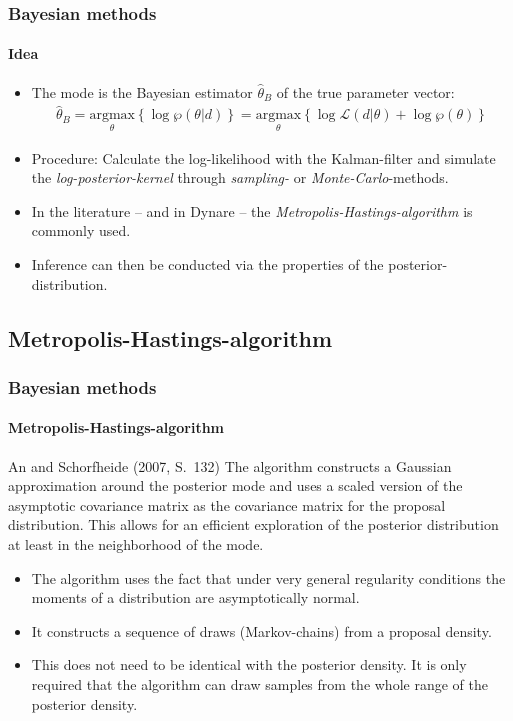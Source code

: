 \documentclass[handout]{beamer}  %
\begin{document}
\begin{frame}\frametitle{Bayesian methods}\framesubtitle{Idea}
	\begin{itemize}
		\item The mode is the Bayesian estimator ${\widehat{\theta}_B}$ of the true parameter vector:
		\begin{align*}
			{\widehat{\theta}_B} = \underset{\theta}{\text{argmax}}\left\{\log{\wp({\theta}|{d})}\right\} = \underset{\theta}{\text{argmax}}\left\{ \log{\mathcal{L}({d}|{\theta})} + \log{\wp({\theta})} \right\}
		\end{align*}
		\item Procedure: Calculate the log-likelihood with the Kalman-filter and simulate the \emph{log-posterior-kernel} through \emph{sampling-} or \emph{Monte-Carlo}-methods.
		\item  In the literature -- and in Dynare -- the \emph{Metropolis-Hastings-algorithm} is commonly used.
		\item  Inference can then be conducted via the properties of the posterior-distribution.
	\end{itemize}
\end{frame}

\subsection{Metropolis-Hastings-algorithm}
\begin{frame}\frametitle{Bayesian methods}\framesubtitle{Metropolis-Hastings-algorithm}
	\begin{block}{An and Schorfheide (2007, S.~132)}
		The algorithm constructs a Gaussian approximation around the posterior mode and
		uses a scaled version of the asymptotic covariance matrix as the covariance
		matrix for the proposal distribution. This allows for an efficient
		exploration of the posterior distribution at least in the neighborhood of
		the mode.
	\end{block}
	\begin{itemize}
		\item The algorithm uses the fact that under very general regularity conditions the moments of a distribution are asymptotically normal.
		\item It constructs a sequence of draws (Markov-chains) from a proposal density.
		\item This does not need to be identical with the posterior density. It is only required that the algorithm can draw samples from the whole range of the posterior density.
	\end{itemize}
\end{frame}
\end{document}
